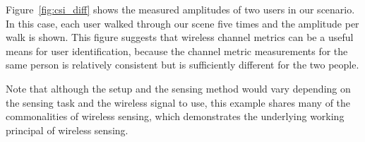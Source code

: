 Figure~\ref{fig:csi_diff} shows the measured \CSI amplitudes of two users in our scenario. In this case, each user walked through our scene
five times and the \CSI amplitude per walk is shown. This figure suggests that wireless channel metrics can be a useful means for user
identification, because the channel metric measurements for the same person is relatively consistent but is sufficiently different for the
two  people.

Note that although the setup and the sensing method would vary depending on the sensing task and the wireless signal to use, this example
shares many of the commonalities of wireless sensing, which demonstrates the underlying working principal of wireless sensing.
